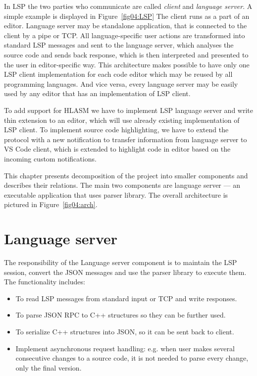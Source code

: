In LSP the two parties who communicate are called \emph{client} and \emph{language server}. A simple example is displayed in Figure~\cref{fig04:LSP} The client runs as a part of an editor. Language server may be standalone application, that is connected to the client by a pipe or TCP. All language-specific user actions are transformed into standard LSP messages and sent to the language server, which analyses the source code and sends back response, which is then interpreted and presented to the user in editor-specific way. This architecture makes possible to have only one LSP client implementation for each code editor which may be reused by all programming languages. And vice versa, every language server may be easily used by any editor that has an implementation of LSP client.

To add support for HLASM we have to implement LSP language server and write thin extension to an editor, which will use already existing implementation of LSP client. To implement source code highlighting, we have to extend the protocol with a new notification to transfer information from language server to VS Code client, which is extended to highlight code in editor based on the incoming custom notifications.

This chapter presents decomposition of the project into smaller components and describes their relations. The main two components are language server --- an executable application that uses parser library. The overall architecture is pictured in Figure~\cref{fig04:arch}.

\section{Language server}

The responsibility of the Language server component is to maintain the LSP session, convert the JSON messages and use the parser library to execute them. The functionality includes:
\begin{itemize}
    \item To read LSP messages from standard input or TCP and write responses.
    \item To parse JSON RPC to C++ structures so they can be further used.
    \item To serialize C++ structures into JSON, so it can be sent back to client.
    \item Implement asynchronous request handling: e.g. when user makes several consecutive changes to a source code, it is not needed to parse every change, only the final version.
\end{itemize}

